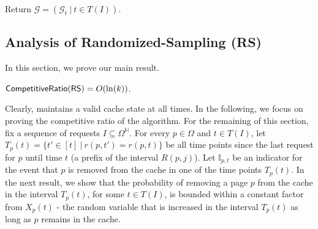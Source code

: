 \documentclass[11pt]{article}
\newcommand{\op}{{\mathbb{I}_{p,t}}}
\newcommand{\cG}{{\mathcal{G}}}
\newcommand{\om}{{\Omega}}
\begin{document}
{\begin{algorithm}[h]
{{		}
		
	
		
	}
	
	Return $\cG = \left( \cG_t~|~t \in T(I) \right)$. 
\end{algorithm}



\subsection{Analysis of \textsf{Randomized-Sampling (RS)}}


 In this section, we prove our main result. 

\begin{theorem}
	\label{theorem:main}
	$\textnormal{\textsf{CompetitiveRatio}}(\textnormal{\textsf{RS}}) = O(\ln(k))$. 
\end{theorem}

Clearly,  maintains a valid cache state at all times. In the following, we focus on proving the competitive ratio of the algorithm.
For the remaining of this section, fix a sequence of requests $I \subseteq \om^{\mathbb{N}}$. For every $p \in \om$ and $t \in T(I)$, let $T_p(t) = \{t' \in [t]~|~r(p,t') = r(p,t)\}$ be all time points since the last request for $p$ until time $t$ (a prefix of the interval $R(p,j)$). Let $\op$ be an indicator for the event that $p$ is removed from the cache in one of the time points $T_p(t)$. %
%
%
%
%
In the next result, we show that the probability of removing a page $p$ from the cache in the interval $T_p(t)$, for some $t \in T(I)$, is bounded within a constant factor from $X_p(t)$ - the random variable that is increased in the interval $T_p(t)$ as long as $p$ remains in the cache. %


}
\end{document}
